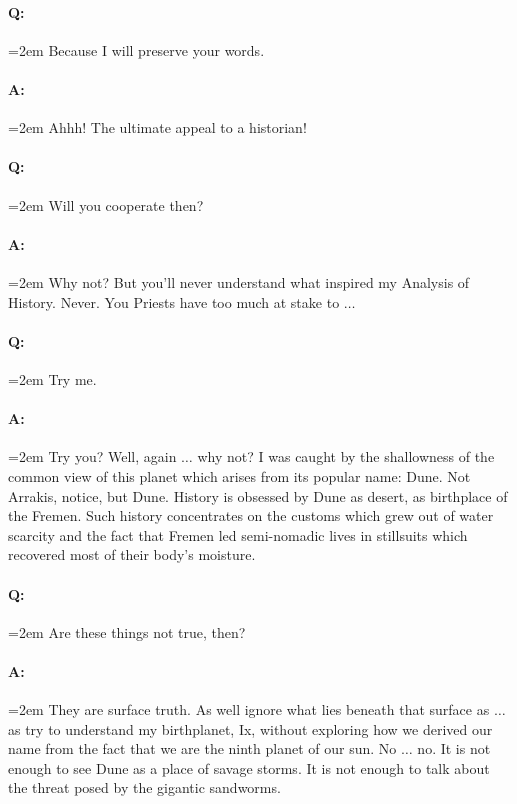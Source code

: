 \documentclass[a4paper, 12pt, oldfontcommands, final]{memoir}
\begin{document}
\paragraph{Q:} \hangindent=2em Because I will preserve your words.
\paragraph{A:} \hangindent=2em Ahhh! The ultimate appeal to a historian!
\paragraph{Q:} \hangindent=2em Will you cooperate then?
\paragraph{A:} \hangindent=2em Why not? But you'll never understand what inspired my Analysis of History. Never. You Priests have too much at stake to $\ldots$
\paragraph{Q:} \hangindent=2em Try me.
\paragraph{A:} \hangindent=2em Try you? Well, again $\ldots$ why not? I was caught by the shallowness of the common view of this planet which arises from its popular name: Dune. Not Arrakis, notice, but Dune. History is obsessed by Dune as desert, as birthplace of the Fremen. Such history concentrates on the customs which grew out of water scarcity and the fact that Fremen led semi-nomadic lives in stillsuits which recovered most of their body's moisture.
\paragraph{Q:} \hangindent=2em Are these things not true, then?
\paragraph{A:} \hangindent=2em They are surface truth. As well ignore what lies beneath that surface as $\ldots$ as try to understand my birthplanet, Ix, without exploring how we derived our name from the fact that we are the ninth planet of our sun. No $\ldots$ no. It is not enough to see Dune as a place of savage storms. It is not enough to talk about the threat posed by the gigantic sandworms.
\end{document}
